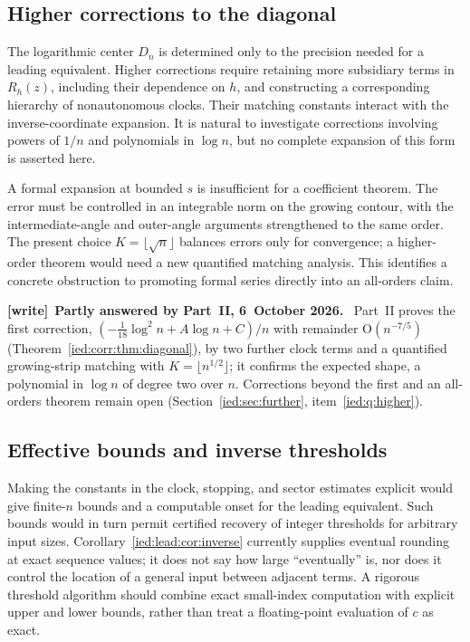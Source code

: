 \documentclass[11pt,letterpaper]{article}
\theoremstyle{remark}\newtheorem{remark}[theorem]{Remark}
\newcommand{\Oh}{\mathrm O}\newcommand{\supp}{\operatorname{supp}}
\newenvironment{writenote}[1][]{\par\smallskip\begingroup\small
 \noindent\textbf{[write]}\if\relax\detokenize{#1}\relax\else~\textbf{#1.}\fi\ }%
 {\par\endgroup\smallskip}
\begin{document}
\subsection{Higher corrections to the diagonal}\label{ied:lead:sub:higher}
The logarithmic center $D_n$ is determined only to the precision needed for a leading equivalent. Higher corrections require retaining more subsidiary terms in $R_h(z)$, including their dependence on $h$, and constructing a corresponding hierarchy of nonautonomous clocks. Their matching constants interact with the inverse-coordinate expansion. It is natural to investigate corrections involving powers of $1/n$ and polynomials in $\log n$, but no complete expansion of this form is asserted here.

A formal expansion at bounded $s$ is insufficient for a coefficient theorem. The error must be controlled in an integrable norm on the growing contour, with the intermediate-angle and outer-angle arguments strengthened to the same order. The present choice $K=\lfloor\sqrt n\rfloor$ balances errors only for convergence; a higher-order theorem would need a new quantified matching analysis. This identifies a concrete obstruction to promoting formal series directly into an all-orders claim.

\begin{writenote}[Partly answered by Part~II, 6~October 2026]
Part~II proves the first correction, $(-\frac1{18}\log^2n+A\log n+C)/n$ with remainder $\Oh(n^{-7/5})$ (Theorem~\ref{ied:corr:thm:diagonal}), by two further clock terms and a quantified growing-strip matching with $K=\lfloor n^{1/2}\rfloor$; it confirms the expected shape, a polynomial in $\log n$ of degree two over $n$. Corrections beyond the first and an all-orders theorem remain open (Section~\ref{ied:sec:further}, item~\ref{ied:q:higher}).
\end{writenote}

\subsection{Effective bounds and inverse thresholds}\label{ied:lead:sub:effective}
Making the constants in the clock, stopping, and sector estimates explicit would give finite-$n$ bounds and a computable onset for the leading equivalent. Such bounds would in turn permit certified recovery of integer thresholds for arbitrary input sizes. Corollary~\ref{ied:lead:cor:inverse} currently supplies eventual rounding at exact sequence values; it does not say how large ``eventually'' is, nor does it control the location of a general input between adjacent terms. A rigorous threshold algorithm should combine exact small-index computation with explicit upper and lower bounds, rather than treat a floating-point evaluation of $c$ as exact.
\end{document}
